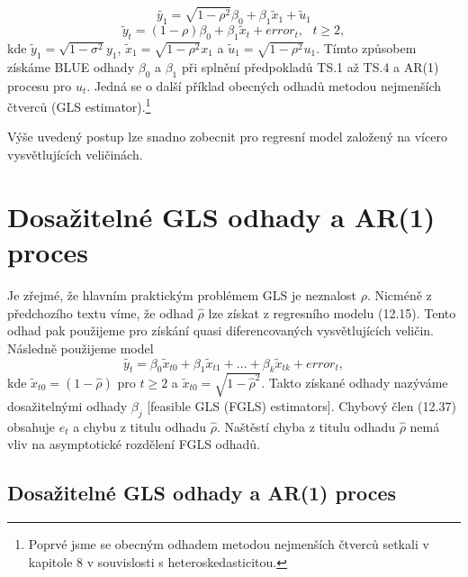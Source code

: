 \begin{equation}
\tilde{y_1} = \sqrt{1 - \rho^2} \beta_0 + \beta_1 \tilde{x}_1 + \tilde{u}_1
\end{equation}
\begin{equation}
\tilde{y}_t = (1 - \rho) \beta_0 + \beta_1 \tilde{x}_t + error_t, ~~~ t \ge 2,
\end{equation}
kde $\tilde{y}_1 = \sqrt{1 - \sigma^2}y_1$, $\tilde{x}_1 = \sqrt{1 - \rho^2}x_1$ a $\tilde{u}_1 = \sqrt{1 - \rho^2}u_1$. Tímto způsobem získáme BLUE odhady $\beta_0$ a $\beta_1$ při splnění předpokladů TS.1 až TS.4 a AR(1) procesu pro $u_t$. Jedná se o další příklad obecných odhadů metodou nejmenších čtverců (GLS estimator).\footnote{Poprvé jsme se obecným odhadem metodou nejmenších čtverců setkali v kapitole 8 v souvislosti s heteroskedasticitou.}

Výše uvedený postup lze snadno zobecnit pro regresní model založený na vícero vysvětlujících veličinách.

\section{Dosažitelné GLS odhady a AR(1) proces}

Je zřejmé, že hlavním praktickým problémem GLS je neznalost $\rho$. Nicméně z předchozího textu víme, že odhad $\hat{\rho}$ lze získat z regresního modelu (12.15). Tento odhad pak použijeme pro získání quasi diferencovaných vysvětlujících veličin. Následně použijeme model
\begin{equation}
\tilde{y_t} = \beta_0\tilde{x}_{t0} + \beta_1\tilde{x}_{t1} + ... + \beta_k\tilde{x}_{tk} + error_t,
\end{equation}
kde $\tilde{x}_{t0} = (1 - \hat{\rho})$ pro $t \ge 2$ a $\tilde{x}_{t0} = \sqrt{1 - \hat{\rho}^2}$. Takto získané odhady nazýváme dosažitelnými odhady $\beta_j$ [feasible GLS (FGLS) estimators]. Chybový člen (12.37) obsahuje $e_t$ a chybu z titulu odhadu $\hat{\rho}$. Naštěstí chyba z titulu odhadu $\hat{\rho}$ nemá vliv na asymptotické rozdělení FGLS odhadů.

\subsection{Dosažitelné GLS odhady a AR(1) proces}

